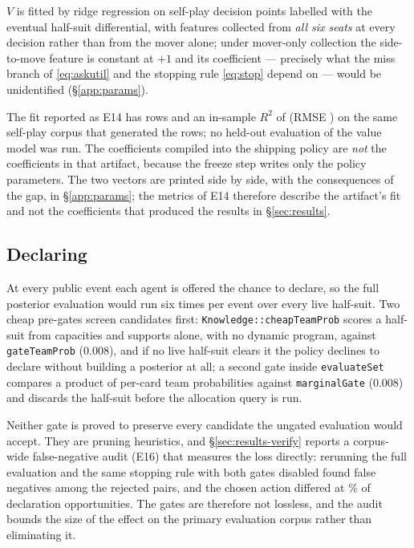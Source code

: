 $V$ is fitted by ridge regression on self-play decision points labelled with
the eventual half-suit differential, with features collected from \emph{all
six seats} at every decision rather than from the mover alone; under
mover-only collection the side-to-move feature is constant at $+1$ and its
coefficient --- precisely what the miss branch of \eqref{eq:askutil} and the
stopping rule \eqref{eq:stop} depend on --- would be unidentified
(\S\ref{app:params}).

The fit reported as E14 has \numValueRows{} rows and an in-sample $R^2$ of
\numValueRSq{} (RMSE \numValueRmse{}) on the same self-play corpus that
generated the rows; no held-out evaluation of the value model was run. The
\numValueFeats{} coefficients compiled into the shipping policy are \emph{not}
the coefficients in that artifact, because the freeze step writes only the
\numParams{} policy parameters. The two vectors are printed side by side, with
the consequences of the gap, in \S\ref{app:params}; the metrics of E14
therefore describe the artifact's fit and not the coefficients that produced
the results in \S\ref{sec:results}.

\subsection{Declaring}
\label{sec:declare}

At every public event each agent is offered the chance to declare, so the full
posterior evaluation would run six times per event over every live half-suit.
Two cheap pre-gates screen candidates first: \texttt{Knowledge::cheapTeamProb}
scores a half-suit from capacities and supports alone, with no dynamic
program, against \texttt{gateTeamProb} ($0.008$), and if no live half-suit
clears it the policy declines to declare without building a posterior at all;
a second gate inside \texttt{evaluateSet} compares a product of per-card team
probabilities against \texttt{marginalGate} ($0.008$) and discards the
half-suit before the allocation query is run.

Neither gate is proved to preserve every candidate the ungated evaluation would
accept. They are pruning heuristics, and \S\ref{sec:results-verify} reports a
corpus-wide false-negative audit (E16) that measures the loss directly: rerunning
the full evaluation and the same stopping rule with both gates disabled found
\numGateFalseNeg{} false negatives among the rejected pairs, and the chosen
action differed at \numGateActionsPct\% of declaration opportunities. The gates
are therefore not lossless, and the audit bounds the size of the effect on the
primary evaluation corpus rather than eliminating it.

